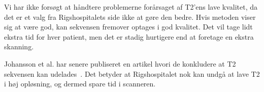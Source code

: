 Vi har ikke forsøgt at håndtere problemerne forårsaget af T2’ens lave kvalitet, da det er et valg fra Rigshospitalets side ikke at gøre den bedre. Hvis metoden viser sig at være god, kan sekvensen fremover optages i god kvalitet. Det vil tage lidt ekstra tid for hver patient, men det er stadig hurtigere end at foretage en ekstra skanning.

Johansson et al. har senere publiseret en artikel hvori de konkludere at T2 sekvensen kan udelades~\cite{bettersCT}.  Det betyder at Rigshospitalet nok kan undgå at lave T2 i høj opløsning, og dermed spare tid i scanneren.